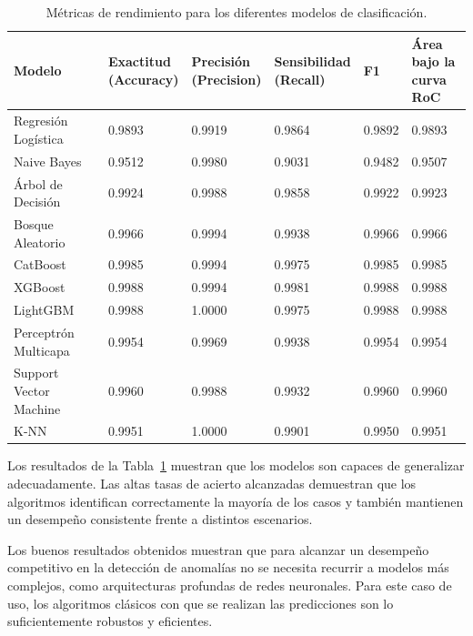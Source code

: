 \documentclass[11pt,a4paper,spanish]{book}
\numberwithin{equation}{chapter}
\numberwithin{figure}{chapter}
\begin{document}
\begin{table}[H]
\caption{Métricas de rendimiento para los diferentes modelos de clasificación.}
\centering
\renewcommand{\arraystretch}{1.2}
\footnotesize
\begin{tabularx}{\textwidth}{|l|X|X|X|X|X|}
\hline
\textbf{Modelo} & 
\centering \textbf{Exactitud \\ (Accuracy)} & 
\centering \textbf{Precisión \\ (Precision)} & 
\centering \textbf{Sensibilidad \\ (Recall)} & 
\centering \textbf{F1} & 
\centering \textbf{Área bajo la \\ curva RoC} \tabularnewline
\hline
Regresión Logística & 0.9893 & 0.9919 & 0.9864 & 0.9892 & 0.9893 \\
\hline
Naive Bayes & 0.9512 & 0.9980 & 0.9031 & 0.9482 & 0.9507 \\
\hline
Árbol de Decisión & 0.9924 & 0.9988 & 0.9858 & 0.9922 & 0.9923 \\
\hline
Bosque Aleatorio & 0.9966 & 0.9994 & 0.9938 & 0.9966 & 0.9966 \\
\hline
CatBoost & 0.9985 & 0.9994 & 0.9975 & 0.9985 & 0.9985 \\
\hline
XGBoost & 0.9988 & 0.9994 & 0.9981 & 0.9988 & 0.9988 \\
\hline
LightGBM & 0.9988 & 1.0000 & 0.9975 & 0.9988 & 0.9988 \\
\hline
Perceptrón Multicapa & 0.9954 & 0.9969 & 0.9938 & 0.9954 & 0.9954 \\
\hline
Support Vector Machine & 0.9960 & 0.9988 & 0.9932 & 0.9960 & 0.9960 \\
\hline
K-NN & 0.9951 & 1.0000 & 0.9901 & 0.9950 & 0.9951 \\
\hline
\end{tabularx}
\label{tab:metricas_modelos}
\end{table}


Los resultados de la Tabla~\ref{tab:metricas_modelos} muestran que
los modelos son capaces de generalizar adecuadamente. 
Las altas tasas de acierto alcanzadas demuestran que los algoritmos identifican 
correctamente la mayoría de los casos y también mantienen un desempeño consistente 
frente a distintos escenarios.


Los buenos resultados obtenidos muestran que para alcanzar un desempeño 
competitivo en la detección de anomalías no se necesita recurrir a modelos 
más complejos, como arquitecturas profundas de redes neuronales. 
Para este caso de uso, los algoritmos clásicos con que se realizan las 
predicciones son lo suficientemente robustos y eficientes. 
\end{document}
